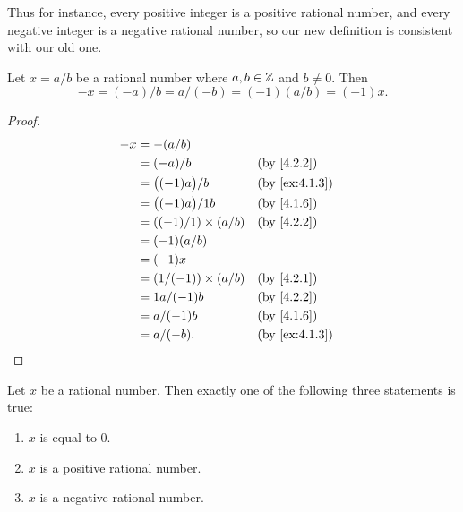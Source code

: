 \begin{note}
  Thus for instance, every positive integer is a positive rational number, and every negative integer is a negative rational number, so our new definition is consistent with our old one.
\end{note}

\begin{ac}\label{ac:4.2.3}
  Let \(x = a / b\) be a rational number where \(a, b \in \mathbb{Z}\) and \(b \neq 0\).
  Then
  \[
    -x = (-a) / b = a / (-b) = (-1)(a / b) = (-1)x.
  \]
\end{ac}

\begin{proof}
  \begin{align*}
    -x & = -(a / b)                                                   \\
       & = (-a) / b                  &  & \text{(by \cref{4.2.2})}    \\
       & = \big((-1)a\big) / b       &  & \text{(by \cref{ex:4.1.3})} \\
       & = \big((-1)a\big) / 1b      &  & \text{(by \cref{4.1.6})}    \\
       & = ((-1) / 1) \times (a / b) &  & \text{(by \cref{4.2.2})}    \\
       & = (-1)(a / b)                                                \\
       & = (-1)x                                                      \\
       & = (1 / (-1)) \times (a / b) &  & \text{(by \cref{4.2.1})}    \\
       & = 1a / (-1)b                &  & \text{(by \cref{4.2.2})}    \\
       & = a / (-1)b                 &  & \text{(by \cref{4.1.6})}    \\
       & = a / (-b).                 &  & \text{(by \cref{ex:4.1.3})}
  \end{align*}
\end{proof}

\begin{lem}\label{4.2.7}
  Let \(x\) be a rational number.
  Then exactly one of the following three statements is true:
  \begin{enumerate}
    \item \(x\) is equal to \(0\).
    \item \(x\) is a positive rational number.
    \item \(x\) is a negative rational number.
  \end{enumerate}
\end{lem}

